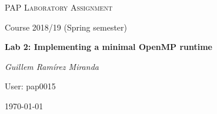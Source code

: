 \makeatletter
\begin{titlepage}
\thispagestyle{empty}
\begin{center}
	\centering
	\vspace{1cm}
	{\scshape\Large PAP Laboratory Assignment\par}
	\vspace{0.75cm}
	{\Large Course 2018/19 (Spring semester)\par}
	\vspace{0.75cm}
	{\huge\bfseries Lab 2: Implementing a minimal OpenMP runtime\par}
	\vspace{1cm}
	{\Large\itshape Guillem Ramírez Miranda\par}
	\vspace{0.5cm}
	{\Large User: pap0015\par}
	\vfill
	{\large \today\par}
\end{center}
\clearpage
\end{titlepage}

